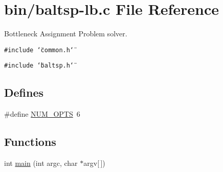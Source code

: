 \hypertarget{bin_2baltsp-lb_8c}{
\section{bin/baltsp-lb.c File Reference}
\label{bin_2baltsp-lb_8c}
}
Bottleneck Assignment Problem solver.  


{\tt \#include \char`\"{}common.h\char`\"{}}\par
{\tt \#include \char`\"{}baltsp.h\char`\"{}}\par
\subsection*{Defines}
\begin{CompactItemize}
\item 
\#define \hyperlink{bin_2baltsp-lb_8c_9b58b2c4af931c8486a986c9deca40f5}{NUM\_\-OPTS}~6
\end{CompactItemize}
\subsection*{Functions}
\begin{CompactItemize}
\item 
int \hyperlink{bin_2baltsp-lb_8c_0ddf1224851353fc92bfbff6f499fa97}{main} (int argc, char $\ast$argv\mbox{[}$\,$\mbox{]})
\end{CompactItemize}
